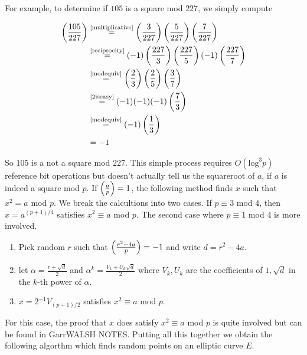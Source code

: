 For example, to determine if $105$ is a square mod $227$, we simply compute 

\begin{align*}
	\left(\frac{105}{227}\right) &\stackrel{\text{\eqref{multiplicative}}}{=} \left(\frac{3}{227}\right)\left(\frac{5}{227}\right)\left(\frac{7}{227}\right) \\
	&\stackrel{\text{\eqref{reciprocity}}}{=} (-1) \left(\frac{227}{3}\right)\left(\frac{227}{5}\right) (-1) \left(\frac{227}{7}\right) \\
	&\stackrel{\text{\eqref{modequiv}}}{=} \left(\frac{2}{3}\right)\left(\frac{2}{5}\right)\left(\frac{3}{7}\right) \\
	&\stackrel{\text{\eqref{2iseasy}}}{=} (-1)(-1)(-1) \left(\frac{7}{3}\right) \\
	&\stackrel{\text{\eqref{modequiv}}}{=} (-1) \left(\frac{1}{3}\right) \\
	&= -1 
\end{align*}

So $105$ is a not a square mod $227$. This simple process requires $O(\text{log}^3p)$ {\color{red}  reference } bit operations but doesn't actually tell us the squareroot of $a$, if $a$ is indeed a square mod $p$. If $\left(\frac{a}{p}\right) = 1 $, the following method finds $x$ such that $x^2 = a$ mod $p$. We break the calcultions into two cases. If $p \equiv 3 $ mod $4$, then $x = a^{(p+1)/4}$ satisfies $x^2 \equiv a $ mod $p$. The second case where $p \equiv 1 $ mod $4$ is more involved.

\begin{enumerate}[1.]
	\item Pick random $r$ such that $\left(\frac{r^2 - 4a}{p}\right) =  -1 $ and write $d = r^2 - 4a$.
	\item let $\alpha = \frac{r+\sqrt{d}}{2}$ and $\alpha^k = \frac{V_k + U_k \sqrt{d}}{2}$ where $V_k,U_k$ are the coefficients of $1, \sqrt{d}$ in the $k$-th power of $\alpha$. 
	\item $x =  2^{-1}V_{(p+1)/2}$ satisfies $x^2 \equiv a $ mod $p$. 
\end{enumerate}

For this case, the proof that $x$ does satisfy $x^2 \equiv a $ mod $p$ is quite involved but can be found in {\color{red} GarrWALSH NOTES}. Putting all this together we obtain the following algorthm which finds random points on an elliptic curve $E$. \\ 


